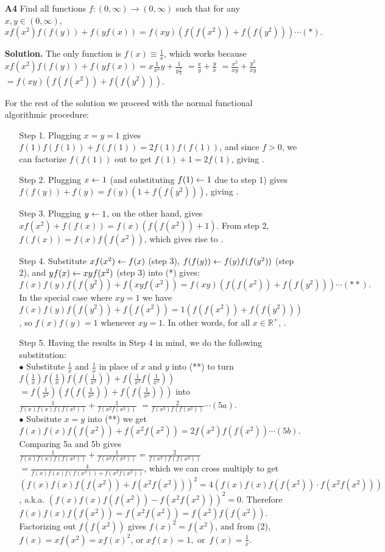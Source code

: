 \documentclass[11pt,a4paper]{article}
\begin{document}
\begin{itemize}
\item[\textbf{A4}]
Find all functions $f:(0,\infty)\rightarrow (0,\infty)$ such that for any $x,y\in (0,\infty)$, $$xf(x^2)f(f(y)) + f(yf(x)) = f(xy) \left(f(f(x^2)) + f(f(y^2))\right)\cdots (*).$$

\textbf{Solution.} 
The only function is $f(x)\equiv \frac 1x$, which works because 
$xf(x^2)f(f(y)) + f(yf(x))=x\frac1 {x^2} y+\frac 1 {y\frac 1{x}}$
$=\frac xy+\frac yx$
$=\frac{x^2}{xy}+\frac{y^2}{xy}$
$=f(xy)\left(f(f(x^2)) + f(f(y^2))\right)$. 

For the rest of the solution we proceed with the normal functional algorithmic procedure: 
\begin{itemize}
\item [Step 1.] 
Plugging $x=y=1$ gives $f(1)f(f(1))+f(f(1))=2f(1)f(f(1))$, 
and since $f>0$, we can factorize $f(f(1))$ out to get $f(1)+1=2f(1)$, giving . 

\item [Step 2.]
Plugging $x\leftarrow 1$ (and substituting $f(1)\leftarrow 1$ due to step 1) gives $f(f(y))+f(y)=f(y)(1+f(f(y^2)))$, 
giving . 

\item [Step 3.]
Plugging $y\leftarrow 1$, on the other hand, gives 
$xf(x^2)+f(f(x))=f(x)(f(f(x^2))+1)$. 
From step 2, $f(f(x))=f(x)f(f(x^2))$, 
which gives rise to . 

\item [Step 4.]
Substitute $xf(x^2)\leftarrow f(x)$ (step 3), $f(f(y))\leftarrow f(y)f(f(y^2))$ (step 2), and $yf(x)\leftarrow xyf(x^2)$ (step 3) into (*) gives: 
$$f(x)f(y)f(f(y^2)) + f(xyf(x^2)) = f(xy) \left(f(f(x^2)) + f(f(y^2))\right)\cdots(**).$$
In the special case where $xy=1$ we have $f(x)f(y)f(f(y^2)) + f(f(x^2)) = 1 \left(f(f(x^2)) + f(f(y^2))\right)$, 
so $f(x)f(y)=1$ whenever $xy=1$. 
In other words, for all $x\in\mathbb{R}^+$, . 

\item [Step 5.]
Having the results in Step 4 in mind, we do the following substitution: \\
$\bullet$ Substitute $\frac 1x$ and $\frac 1x$ in place of $x$ and $y$ into (**) to turn
$f(\frac 1x)f(\frac 1x)f(f(\frac 1{x^2})) + f(\frac 1{x^2}f(\frac 1{x^2}))$ 
$= f(\frac 1{x^2}) \left(f(f(\frac 1{x^2})) + f(f(\frac 1{x^2}))\right)$
into 
$\frac 1{f(x)f(x)f(f(x^2))}+ \frac 1{f(x^2f(x^2))}$ 
$= \frac 2{f(x^2)f(f(x^2))}\cdots (5a)$. \\
$\bullet$ Subsitute $x=y$ into (**) we get 
$f(x)f(x)f(f(x^2)) + f(x^2f(x^2)) = 2f(x^2) f(f(x^2))\cdots (5b).$ \\
Comparing 5a and 5b gives 
$\frac 1{f(x)f(x)f(f(x^2))}+ \frac 1{f(x^2f(x^2))}=\frac 2{f(x^2)f(f(x^2))}$
$=\frac 4{f(x)f(x)f(f(x^2))+f(x^2f(x^2))}$, 
which we can cross multiply to get 
$(f(x)f(x)f(f(x^2))+ f(x^2f(x^2)))^2=4(f(x)f(x)f(f(x^2))\cdot f(x^2f(x^2)))$, 
a.k.a. $(f(x)f(x)f(f(x^2))- f(x^2f(x^2)))^2=0$. 
Therefore $f(x)f(x)f(f(x^2))=f(x^2f(x^2))=f(x^2)f(f(x^2))$. 
Factorizing out $f(f(x^2))$ gives $f(x)^2=f(x^2)$, 
and from (2), $f(x)=xf(x^2)=xf(x)^2$, or \hbox{$xf(x)=1$, or $f(x)=\frac 1x$}. 


\end{itemize}
\end{itemize}
\end{document}
